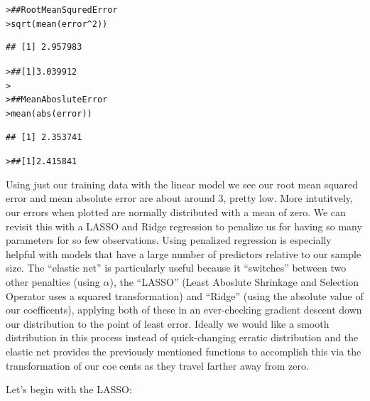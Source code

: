 \documentclass[12pt]{article}\usepackage[]{graphicx}\usepackage[]{color}
\makeatletter
\newcommand{\hlnum}[1]{\textcolor[rgb]{0.82,0.78,0.62}{#1}}%
\newcommand{\hlcom}[1]{\textcolor[rgb]{0.404,0.408,0.42}{#1}}%
\newcommand{\hlopt}[1]{\textcolor[rgb]{0.882,0.878,0.898}{#1}}%
\newcommand{\hlstd}[1]{\textcolor[rgb]{0.882,0.878,0.898}{#1}}%
\newcommand{\hlkwd}[1]{\textcolor[rgb]{0.733,0.388,0.812}{#1}}%
\newenvironment{kframe}{%
 \def\at@end@of@kframe{}%
 \ifinner\ifhmode%
  \def\at@end@of@kframe{\end{minipage}}%
  \begin{minipage}{\columnwidth}%
 \fi\fi%
 \def\FrameCommand##1{\hskip\@totalleftmargin \hskip-\fboxsep
 \colorbox{shadecolor}{##1}\hskip-\fboxsep
     \hskip-\linewidth \hskip-\@totalleftmargin \hskip\columnwidth}%
 \MakeFramed {\advance\hsize-\width
   \@totalleftmargin\z@ \linewidth\hsize
   \@setminipage}}%
 {\par\unskip\endMakeFramed%
 \at@end@of@kframe}
\newenvironment{knitrout}{}{} %
\makeatother
\begin{document}
\begin{flushleft}
\begin{center}
\begin{knitrout}
\end{knitrout}
\end{center}

\begin{knitrout}
\color{fgcolor}\begin{kframe}
\begin{alltt}
\hlstd{> }\hlcom{## Root Mean Squred Error}
\hlstd{> }\hlkwd{sqrt}\hlstd{(}\hlkwd{mean}\hlstd{(error}\hlopt{^}\hlnum{2}\hlstd{))}
\end{alltt}
\begin{verbatim}
## [1] 2.957983
\end{verbatim}
\begin{alltt}
\hlstd{> }\hlcom{## [1] 3.039912}
\hlstd{> }
\hlstd{> }\hlcom{## Mean Aboslute Error}
\hlstd{> }\hlkwd{mean}\hlstd{(}\hlkwd{abs}\hlstd{(error))}
\end{alltt}
\begin{verbatim}
## [1] 2.353741
\end{verbatim}
\begin{alltt}
\hlstd{> }\hlcom{## [1] 2.415841}
\end{alltt}
\end{kframe}
\end{knitrout}

Using just our training data with the linear model we see our root mean squared error and mean absolute error are about around 3, pretty low. More intutitvely, our errors when plotted are normally distributed with a mean of zero. We can revisit this with a LASSO and Ridge regression to penalize us for having so many parameters for so few observations. Using penalized regression is especially helpful with models that have a large number of predictors relative to our sample size. The ``elastic net'' is particularly useful because it ``switches'' between two other penalties (using $\alpha$), the ``LASSO'' (Least Aboslute Shrinkage and Selection Operator uses a squared transformation) and “Ridge” (using the absolute value of our coefficents), applying both of these in an ever-checking gradient descent down our distribution to the point of least error. Ideally we would like a smooth distribution in this process instead of quick-changing erratic distribution and the elastic net provides the previously mentioned functions to accomplish this via the transformation of our coecents as they travel farther away from zero.  

Let's begin with the LASSO:


\end{flushleft}
\end{document}
